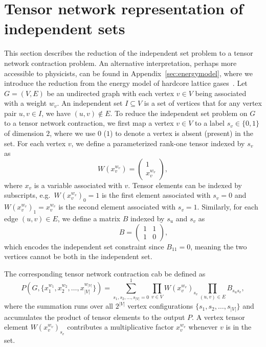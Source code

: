 \documentclass[onefignum, onetabnum]{siamart190516}
\newcommand{\<}{\langle}
\renewcommand{\>}{\rangle}
\newcommand{\App}[1]{Appendix~\ref{#1}}
\begin{document}
\section{Tensor network representation of independent sets} \label{sec:tnmap}
This section describes the reduction of the independent set problem to a tensor network contraction problem.
An alternative interpretation, perhaps more accessible to physicists, can be found in \App{sec:energymodel}, where we introduce the reduction from the energy model of hardcore lattice gases~\cite{Dyre2016, Fernandes2007}.
Let $G=(V,E)$ be an undirected graph with each vertex $v\in V$ being associated with a weight $w_v$.
An independent set $I \subseteq V$ is a set of vertices that for any vertex pair $u,v \in I$, we have $(u, v) \not\in E$.
To reduce the independent set problem on $G$ to a tensor network contraction, we first map a vertex $v\in V$ to a label $s_v \in \{0, 1\}$ of dimension $2$, where we use $0$ ($1$) to denote a vertex is absent (present) in the set.
For each vertex $v$, we define a parameterized rank-one tensor indexed by $s_v$ as
\begin{equation}
    W(x_v^{w_v}) = \left(\begin{matrix}
        1 \\
        x_v^{w_v}
    \end{matrix}\right),\label{eq:vertextensor}
\end{equation}
where $x_v$ is a variable associated with $v$.
Tensor elements can be indexed by subscripts, e.g.\ $W(x_v^{w_v})_0=1$ is the first element associated with $s_v=0$ and $W(x_v^{w_v})_1=x_v^{w_v}$ is the second element associated with $s_v=1$.
Similarly, for each edge $(u, v) \in E$, we define a matrix $B$ indexed by $s_u$ and $s_v$ as
\begin{equation}
    \qquad \quad 
       B = \left(\begin{matrix}
        1  & 1\\
        1 & 0
    \end{matrix}\right), \label{eq:edgetensor}
\end{equation}
which encodes the independent set constraint since $B_{11} = 0$, meaning the two vertices cannot be both in the independent set. 

The corresponding tensor network contraction cab be defined as
\begin{equation}\label{eq:idp}
    P(G, \{x_1^{w_1}, x_{2}^{w_2}, \ldots,x_{|V|}^{w_{|V|}}\}) = \sum\limits_{s_1, s_2, \ldots, s_{|V|} = 0}^{1} \prod\limits_{v\in V} W(x_v^{w_v})_{s_v} \prod\limits_{(u,v) \in E} B_{s_u s_v},
\end{equation}
where the summation runs over all $2^{|V|}$ vertex configurations $\{s_1, s_{2}, \ldots,s_{|V|}\}$ and accumulates the product of tensor elements to the output $P$. 
A vertex tensor element $W(x_v^{w_v})_{s_v}$ contributes a multiplicative factor $x_v^{w_v}$ whenever $v$ is in the set.
\end{document}

